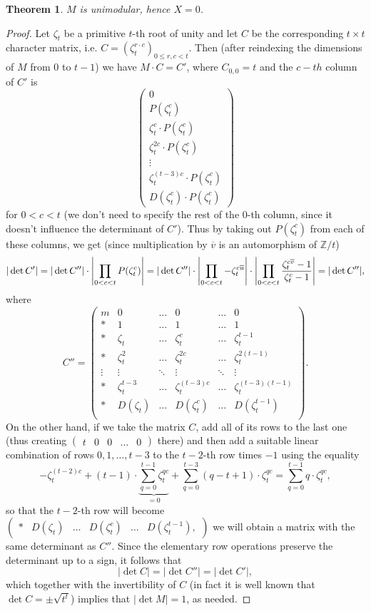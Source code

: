 \documentclass[12pt,a4paper]{article}
\newtheorem{theorem}{Theorem}
\newcommand{\Z}{\mathbb{Z}}
\newcommand{\zt}{\zeta_t}
\newcommand{\uo}{\overline{u}}
\newcommand{\vo}{\overline{v}}
\DeclarePairedDelimiter\abs{\lvert}{\rvert}
\begin{document}
\begin{theorem}
$M$ is unimodular, hence $X=0$.
\end{theorem}
\begin{proof}
Let $\zt$ be a primitive $t$-th root of unity and let $C$ be the corresponding $t\times t$ character matrix, i.e. $C=(\zt^{r\cdot c})_{0\leq r,c<t}$. Then (after reindexing the dimensions of $M$ from $0$ to $t-1$) we have $M\cdot C=C'$, where $C_{0,0}=t$ and the $c-th$ column of $C'$ is
$$
\begin{pmatrix}
0\\ 
P(\zt^c) \\ 
\zt^c \cdot P(\zt^c) \\ 
\zt^{2c} \cdot P(\zt^c) \\ 
\vdots\\ 
\zt^{(t-3)c} \cdot P(\zt^c) \\ 
D(\zt^c) \cdot P(\zt^c)
\end{pmatrix}
$$
for $0<c<t$ (we don't need to specify the rest of the $0$-th column, since it doesn't influence the determinant of $C'$). Thus by taking out $P(\zt^c)$ from each of these columns, we get  (since multiplication by $\vo$ is an automorphism of $\Z/t$)
$$|\det C'|=|\det C''|\cdot\abs*{\prod_{0<c<t}P(\zt^c)}=|\det C''|\cdot\abs*{\prod_{0<c<t}-\zt^{c\uo}}\cdot\abs*{\prod_{0<c<t}\frac{\zt^{c\vo}-1}{\zt^c-1}}=|\det C''|,$$
where
$$C''=
\begin{pmatrix}
m& 0& \dots & 0 & \dots & 0\\ 
*& 1& \dots & 1 & \dots & 1\\ 
*& \zt& \dots & \zt^c & \dots & \zt^{t-1}\\ 
*& \zt^2& \dots & \zt^{2c} & \dots & \zt^{2(t-1)}\\ 
\vdots& \vdots&\ddots  & \vdots & \ddots & \vdots\\ 
*& \zt^{t-3}& \dots & \zt^{(t-3)c} & \dots & \zt^{(t-3)(t-1)}\\ 
*& D(\zt)& \dots & D(\zt^c) & \dots & D(\zt^{t-1})\\ 
\end{pmatrix}.
$$
On the other hand, if we take the matrix $C$, add all of its rows to the last one (thus creating $\begin{pmatrix}
t & 0 & 0& \dots &0
\end{pmatrix}$
there) and then add a suitable linear combination of rows $0,1,\dots, t-3$ to the $t-2$-th row times $-1$ using the equality
$$-\zt^{(t-2)c}+(t-1)\cdot\underbrace{\sum_{q=0}^{t-1}\zt^{qc}}_{=0}+\sum_{q=0}^{t-3}(q-t+1)\cdot\zt^{qc}=\sum_{q=0}^{t-1}q\cdot\zt^{qc},$$
so that the $t-2$-th row will become
$\begin{pmatrix}
*& D(\zt)& \dots & D(\zt^c) & \dots & D(\zt^{t-1}),
\end{pmatrix}$
we will obtain a matrix with the same determinant as $C''$. Since the elementary row operations preserve the determinant up to a sign, it follows that
$$|\det C|=|\det C''|=|\det C'|,$$ which together with the invertibility of $C$ (in fact it is well known that $\det C=\pm \sqrt{t^t}$) implies that $|\det M|=1$, as needed.
\end{proof}
\end{document}
